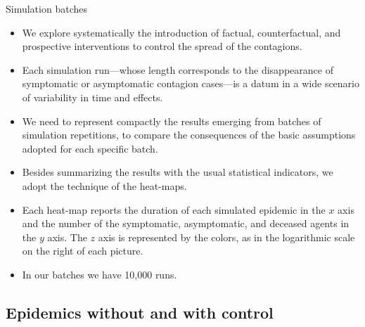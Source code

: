 \documentclass[8pt]{beamer}
\begin{document}
\begin{frame}{Simulation batches}

  \begin{itemize}
  \item

We explore systematically the introduction of factual, counterfactual, and prospective interventions to control the spread of the contagions. 

  \item
Each simulation run---whose length corresponds to the disappearance of symptomatic or asymptomatic contagion cases---is a datum in a wide scenario of variability in time and effects.   
  
  \item
We need to represent compactly the results  emerging from batches of simulation repetitions, to compare the  consequences of the basic assumptions adopted for each specific batch.

 \item
Besides summarizing the results with the usual statistical indicators, we adopt the technique of the heat-maps.

\item
Each heat-map reports the duration of each simulated epidemic in the $x$ axis and the number of the symptomatic, asymptomatic, and deceased agents in the $y$ axis. The $z$ axis is represented by the colors, as in the logarithmic scale on the right of each picture. 

\item
In our batches we have 10,000 runs.

\end{itemize}
\end{frame}

\subsection{Epidemics without and with control}
\end{document}
